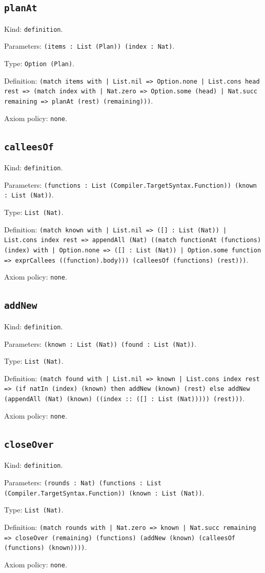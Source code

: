 \documentclass[11pt]{article}
\begin{document}
\subsection*{\texttt{planAt}}
\noindent Kind: \texttt{definition}.\par
\noindent Parameters: \texttt{(items : List (Plan)) (index : Nat)}.\par
\noindent Type: \texttt{Option (Plan)}.\par
\noindent Definition: \texttt{(match items with | List.nil => Option.none | List.cons head rest => (match index with | Nat.zero => Option.some (head) | Nat.succ remaining => planAt (rest) (remaining)))}.\par
\noindent Axiom policy: \texttt{none}.\par
\subsection*{\texttt{calleesOf}}
\noindent Kind: \texttt{definition}.\par
\noindent Parameters: \texttt{(functions : List (Compiler.TargetSyntax.Function)) (known : List (Nat))}.\par
\noindent Type: \texttt{List (Nat)}.\par
\noindent Definition: \texttt{(match known with | List.nil => ([] : List (Nat)) | List.cons index rest => appendAll (Nat) ((match functionAt (functions) (index) with | Option.none => ([] : List (Nat)) | Option.some function => exprCallees ((function).body))) (calleesOf (functions) (rest)))}.\par
\noindent Axiom policy: \texttt{none}.\par
\subsection*{\texttt{addNew}}
\noindent Kind: \texttt{definition}.\par
\noindent Parameters: \texttt{(known : List (Nat)) (found : List (Nat))}.\par
\noindent Type: \texttt{List (Nat)}.\par
\noindent Definition: \texttt{(match found with | List.nil => known | List.cons index rest => (if natIn (index) (known) then addNew (known) (rest) else addNew (appendAll (Nat) (known) ((index :: ([] : List (Nat))))) (rest)))}.\par
\noindent Axiom policy: \texttt{none}.\par
\subsection*{\texttt{closeOver}}
\noindent Kind: \texttt{definition}.\par
\noindent Parameters: \texttt{(rounds : Nat) (functions : List (Compiler.TargetSyntax.Function)) (known : List (Nat))}.\par
\noindent Type: \texttt{List (Nat)}.\par
\noindent Definition: \texttt{(match rounds with | Nat.zero => known | Nat.succ remaining => closeOver (remaining) (functions) (addNew (known) (calleesOf (functions) (known))))}.\par
\noindent Axiom policy: \texttt{none}.\par
\end{document}
